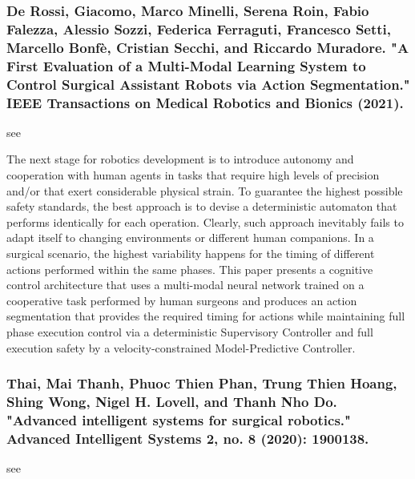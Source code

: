 \documentclass[conference]{IEEEtran}
\begin{document}
\medskip
\subsubsection{De Rossi, Giacomo, Marco Minelli, Serena Roin, Fabio Falezza, Alessio Sozzi, Federica Ferraguti, Francesco Setti, Marcello Bonfè, Cristian Secchi, and Riccardo Muradore. "A First Evaluation of a Multi-Modal Learning System to Control Surgical Assistant Robots via Action Segmentation." IEEE Transactions on Medical Robotics and Bionics (2021).}
see \cite{de2021first}

The next stage for robotics development is to introduce autonomy and cooperation with human agents in tasks that require high levels of precision and/or that exert considerable physical strain. To guarantee the highest possible safety standards, the best approach is to devise a deterministic automaton that performs identically for each operation. Clearly, such approach inevitably fails to adapt itself to changing environments or different human companions. In a surgical scenario, the highest variability happens for the timing of different actions performed within the same phases. This paper presents a cognitive control architecture that uses a multi-modal neural network trained on a cooperative task performed by human surgeons and produces an action segmentation that provides the required timing for actions while maintaining full phase execution control via a deterministic Supervisory Controller and full execution safety by a velocity-constrained Model-Predictive Controller.

\medskip
\subsubsection{Thai, Mai Thanh, Phuoc Thien Phan, Trung Thien Hoang, Shing Wong, Nigel H. Lovell, and Thanh Nho Do. "Advanced intelligent systems for surgical robotics." Advanced Intelligent Systems 2, no. 8 (2020): 1900138.}
see \cite{thai2020advanced}
\end{document}
